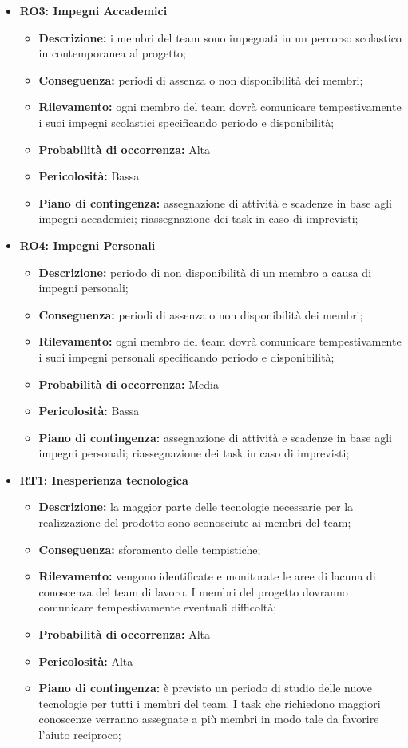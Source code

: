 \begin{itemize}
	\item \textbf{RO3: Impegni Accademici}
	\begin{itemize}
		\item \textbf{Descrizione:} i membri del team sono impegnati in un percorso scolastico in contemporanea al progetto;
		\item \textbf{Conseguenza:} periodi di assenza o non disponibilità dei membri;
		\item \textbf{Rilevamento:} ogni membro del team dovrà comunicare tempestivamente i suoi impegni scolastici specificando periodo e disponibilità;
		\item \textbf{Probabilità di occorrenza:} Alta
		\item \textbf{Pericolosità:} Bassa
		\item \textbf{Piano di contingenza:} assegnazione di attività e scadenze in base agli impegni accademici; riassegnazione dei task in caso di imprevisti;
	\end{itemize}
	
	\item \textbf{RO4: Impegni Personali}
	\begin{itemize}
		\item \textbf{Descrizione:} periodo di non disponibilità di un membro a causa di impegni personali;
		\item \textbf{Conseguenza:} periodi di assenza o non disponibilità dei membri;
		\item \textbf{Rilevamento:} ogni membro del team dovrà comunicare tempestivamente i suoi impegni personali specificando periodo e disponibilità;
		\item \textbf{Probabilità di occorrenza:} Media
		\item \textbf{Pericolosità:} Bassa
		\item \textbf{Piano di contingenza:} assegnazione di attività e scadenze in base agli impegni personali; riassegnazione dei task in caso di imprevisti;

	\end{itemize}
	
	\item \textbf{RT1: Inesperienza tecnologica}
	\begin{itemize}
		\item \textbf{Descrizione:} la maggior parte delle tecnologie necessarie per la realizzazione del prodotto sono sconosciute ai membri del team;
		\item \textbf{Conseguenza:} sforamento delle tempistiche;
		\item \textbf{Rilevamento:} vengono identificate e monitorate le aree di lacuna di conoscenza del team di lavoro. I membri del progetto dovranno comunicare tempestivamente eventuali difficoltà;
		\item \textbf{Probabilità di occorrenza:} Alta
		\item \textbf{Pericolosità:} Alta
		\item \textbf{Piano di contingenza:} è previsto un periodo di studio delle nuove tecnologie per tutti i membri del team. I task che richiedono maggiori conoscenze verranno assegnate a più membri in modo tale da favorire l'aiuto reciproco;
	\end{itemize}
	

\end{itemize}
